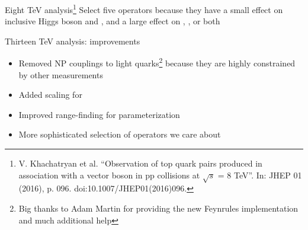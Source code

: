 \documentclass[professionalfont,fleqn]{beamer}
\begin{document}
\begin{frame}{Eight TeV analysis\footnote{\tiny V. Khachatryan et al. ``Observation of top quark pairs produced in association with a vector boson in pp collisions at $\sqrt{s}$ = 8 TeV''. In: JHEP 01 (2016), p. 096. doi:10.1007/JHEP01(2016)096.}}
  Select five operators because they have a small effect on inclusive Higgs boson and \ttbar, and a large effect on \ttZ, \ttW, or both
  \vspace{1cm}

\end{frame}

\begin{frame}{Thirteen TeV analysis: improvements}
  \begin{itemize}
    \item Removed NP couplings to light quarks\footnote{Big thanks to Adam Martin for providing the new Feynrules implementation and much additional help} because they are highly constrained by other measurements
    \item Added scaling for \ttH
    \item Improved range-finding for parameterization
    \item More sophisticated selection of operators we care about
\end{itemize}
\end{frame}
\end{document}
